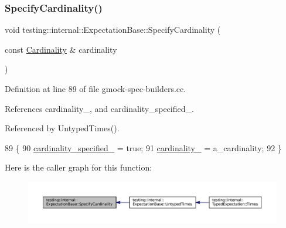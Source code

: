 \subsubsection{\texorpdfstring{Specify\+Cardinality()}{SpecifyCardinality()}}
{\footnotesize\ttfamily void testing\+::internal\+::\+Expectation\+Base\+::\+Specify\+Cardinality (\begin{DoxyParamCaption}\item[{const \hyperlink{classtesting_1_1Cardinality}{Cardinality} \&}]{cardinality }\end{DoxyParamCaption})\hspace{0.3cm}{\ttfamily [protected]}}



Definition at line 89 of file gmock-\/spec-\/builders.\+cc.



References cardinality\+\_\+, and cardinality\+\_\+specified\+\_\+.



Referenced by Untyped\+Times().


\begin{DoxyCode}
89                                                                          \{
90   \hyperlink{classtesting_1_1internal_1_1ExpectationBase_ad2ca7220ed1a395bd850ff06c500a402}{cardinality\_specified\_} = \textcolor{keyword}{true};
91   \hyperlink{classtesting_1_1internal_1_1ExpectationBase_ad0aedcc01c0c9a998952a2b2f486595c}{cardinality\_} = a\_cardinality;
92 \}
\end{DoxyCode}
Here is the caller graph for this function\+:
\nopagebreak
\begin{figure}[H]
\begin{center}
\leavevmode
\includegraphics[width=350pt]{classtesting_1_1internal_1_1ExpectationBase_a3d1d08542b32239d9b5738e3e32e2217_icgraph}
\end{center}
\end{figure}
\mbox{\label{classtesting_1_1internal_1_1ExpectationBase_a05bbd7fea6ea3c740ea095ea7462bc07}} 
